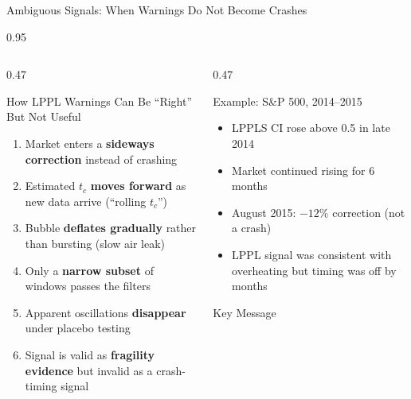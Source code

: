 \documentclass[9pt, aspectratio=169, t]{beamer}
\begin{document}
\begin{frame}{Ambiguous Signals: When Warnings Do Not Become Crashes}
    \begin{cminipage}{0.95\textwidth}
    {\scriptsize
    \begin{columns}[T]
        \begin{column}{0.47\textwidth}
            \begin{block}{How LPPL Warnings Can Be ``Right'' But Not Useful}
                \begin{enumerate}\setlength{\itemsep}{1pt}
                    \item Market enters a \textbf{sideways correction} instead of crashing
                    \item Estimated $t_c$ \textbf{moves forward} as new data arrive (``rolling $t_c$'')
                    \item Bubble \textbf{deflates gradually} rather than bursting (slow air leak)
                    \item Only a \textbf{narrow subset} of windows passes the filters
                    \item Apparent oscillations \textbf{disappear} under placebo testing
                    \item Signal is valid as \textbf{fragility evidence} but invalid as a crash-timing signal
                \end{enumerate}
            \end{block}
        \end{column}
        \begin{column}{0.47\textwidth}
            \begin{alertblock}{Example: S\&P 500, 2014--2015}
                \begin{itemize}\setlength{\itemsep}{0pt}
                    \item LPPLS CI rose above 0.5 in late 2014
                    \item Market continued rising for 6 months
                    \item August 2015: $-12\%$ correction (not a crash)
                    \item LPPL signal was consistent with overheating but timing was off by months
                \end{itemize}
            \end{alertblock}
            \vspace{-2mm}
            \begin{exampleblock}{Key Message}

\end{exampleblock}
\end{column}
\end{columns}}
\end{cminipage}
\end{frame}
\end{document}
